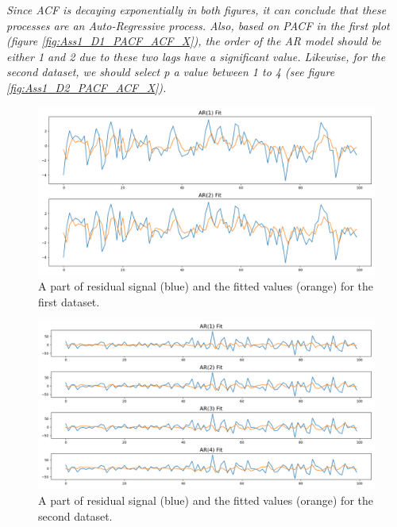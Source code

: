 \textit{Since \gls{ACF} is decaying exponentially in both figures, it can conclude that these processes are an Auto-Regressive process. Also, based on \gls{PACF} in the first plot (figure \ref{fig:Ass1_D1_PACF_ACF_X}), the order of the \gls{AR} model should be either 1 and 2 due to these two lags have a significant value. Likewise, for the second dataset, we should select p a value between 1 to 4 (see figure \ref{fig:Ass1_D2_PACF_ACF_X}).}

\begin{figure}[H]
    \centering
    \begin{minipage}[b]{1\textwidth}
        \includegraphics[width=\textwidth]{figures/Ass1/Ass1_D1_ARs models.png}
    \end{minipage}
    \caption{A part of residual signal (blue) and the fitted values (orange) for the first dataset.}
    \label{fig:Ass1_D1_ARs_models}
\end{figure}

\begin{figure}[H]
    \centering
    \begin{minipage}[b]{1\textwidth}
        \includegraphics[width=\textwidth]{figures/Ass1/Ass1_D2_ARs models.png}
    \end{minipage}
    \caption{A part of residual signal (blue) and the fitted values (orange) for the second dataset.}
    \label{fig:Ass1_D2_ARs_models}
\end{figure}


